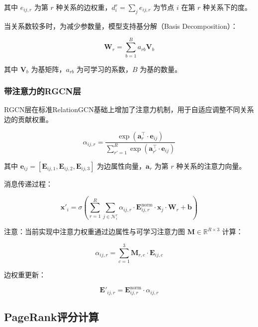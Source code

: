 其中 $e_{ij,r}$ 为第 $r$ 种关系的边权重，$d_i^r = \sum_j e_{ij,r}$ 为节点 $i$ 在第 $r$ 种关系下的度。

当关系数较多时，为减少参数量，模型支持基分解（Basis Decomposition）：

\begin{equation}
\mathbf{W}_r = \sum_{b=1}^{B} a_{rb} \mathbf{V}_b
\end{equation}

其中 $\mathbf{V}_b$ 为基矩阵，$a_{rb}$ 为可学习的系数，$B$ 为基的数量。

\subsubsection{带注意力的RGCN层}

RGCN层在标准RelationGCN基础上增加了注意力机制，用于自适应调整不同关系边的贡献权重。

\begin{equation}
\alpha_{ij,r} = \frac{\exp\left(\mathbf{a}_r^{\top} \cdot \mathbf{e}_{ij}\right)}{\sum_{r'=1}^{R} \exp\left(\mathbf{a}_{r'}^{\top} \cdot \mathbf{e}_{ij}\right)}
\end{equation}

其中 $\mathbf{e}_{ij} = [\mathbf{E}_{ij,1}, \mathbf{E}_{ij,2}, \mathbf{E}_{ij,3}]$ 为边属性向量，$\mathbf{a}_r$ 为第 $r$ 种关系的注意力向量。

消息传递过程：

\begin{equation}
\mathbf{x}'_i = \sigma\left( \sum_{r=1}^{R} \sum_{j \in \mathcal{N}_i^r} \alpha_{ij,r} \cdot \mathbf{E}_{ij,r}^{\text{norm}} \cdot \mathbf{x}_j \cdot \mathbf{W}_r + \mathbf{b} \right)
\end{equation}

注意：当前实现中注意力权重通过边属性与可学习注意力图 $\mathbf{M} \in \mathbb{R}^{R \times 3}$ 计算：

\begin{equation}
\alpha_{ij,r} = \sum_{c=1}^{3} \mathbf{M}_{r,c} \cdot \mathbf{E}_{ij,c}
\end{equation}

边权重更新：

\begin{equation}
\mathbf{E}'_{ij,r} = \mathbf{E}_{ij,r}^{\text{norm}} \cdot \alpha_{ij,r}
\end{equation}

\subsection{PageRank评分计算}

